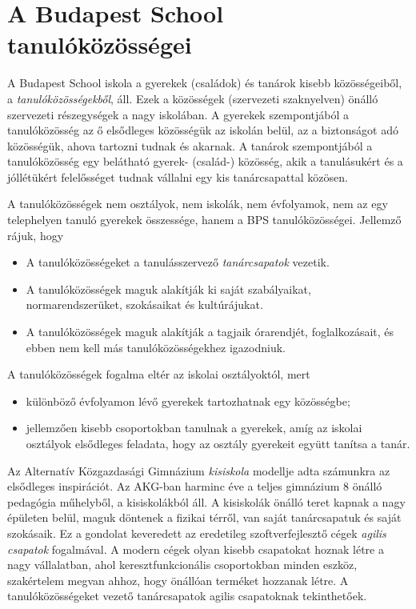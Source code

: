 \hypertarget{a-budapest-school-tanulokozossegei}{%
\section{A Budapest School
tanulóközösségei}\label{a-budapest-school-tanulokozossegei}}

A Budapest School iskola a gyerekek (családok) és tanárok kisebb
közösségeiből, a \emph{tanulóközösségekből}, áll. Ezek a közösségek
(szervezeti szaknyelven) önálló szervezeti részegységek a nagy
iskolában. A gyerekek szempontjából a tanulóközösség az ő elsődleges
közösségük az iskolán belül, az a biztonságot adó közösségük, ahova
tartozni tudnak és akarnak. A tanárok szempontjából a tanulóközösség egy
belátható gyerek- (család-) közösség, akik a tanulásukért és a jóllétükért
felelősséget tudnak vállalni egy kis tanárcsapattal közösen.

A tanulóközösségek nem osztályok, nem iskolák, nem évfolyamok, nem az
egy telephelyen tanuló gyerekek összessége, hanem a BPS
tanulóközösségei. Jellemző rájuk, hogy

\begin{itemize}
\tightlist
\item
  A tanulóközösségeket a tanulásszervező \emph{tanárcsapatok} vezetik.
\item
  A tanulóközösségek maguk alakítják ki saját szabályaikat,
  normarendszerüket, szokásaikat és kultúrájukat.
\item
  A tanulóközösségek maguk alakítják a tagjaik órarendjét,
  foglalkozásait, és ebben nem kell más tanulóközösségekhez igazodniuk.
\end{itemize}

A tanulóközösségek fogalma eltér az iskolai osztályoktól, mert

\begin{itemize}
\tightlist
\item
  különböző évfolyamon lévő gyerekek tartozhatnak egy közösségbe;
\item
  jellemzően kisebb csoportokban tanulnak a gyerekek, amíg az iskolai
  osztályok elsődleges feladata, hogy az osztály gyerekeit együtt
  tanítsa a tanár.
\end{itemize}

Az Alternatív Közgazdasági Gimnázium \emph{kisiskola} modellje adta
számunkra az elsődleges inspirációt. Az AKG-ban harminc éve a teljes
gimnázium 8 önálló pedagógia műhelyből, a kisiskolákból áll. A kisiskolák
önálló teret kapnak a nagy épületen belül, maguk döntenek a fizikai
térről, van saját tanárcsapatuk és saját szokásaik. Ez a gondolat
keveredett az eredetileg szoftverfejlesztő cégek \emph{agilis csapatok}
fogalmával. A modern cégek olyan kisebb csapatokat hoznak létre a nagy
vállalatban, ahol keresztfunkcionális csoportokban minden eszköz,
szakértelem megvan ahhoz, hogy önállóan terméket hozzanak létre. A
tanulóközösségeket vezető tanárcsapatok agilis csapatoknak tekinthetőek.

